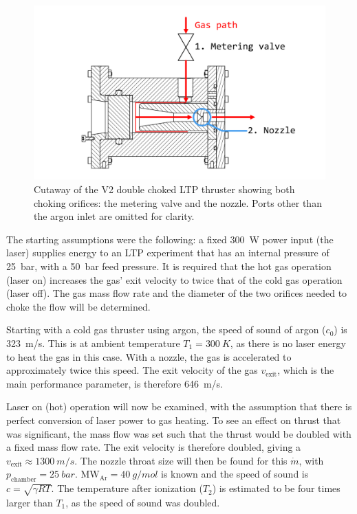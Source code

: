             \begin{figure}[h]
                \centering
                \includegraphics[width=0.8\linewidth]{assets/3 design/Double choked LTP thruster.pdf}
                \caption{Cutaway of the V2 double choked LTP thruster showing both choking orifices: the metering valve and the nozzle. Ports other than the argon inlet are omitted for clarity.}
                \label{fig:double choke sizing}
            \end{figure}
            
            The starting assumptions were the following: a fixed \qty{300}{W} power input (the laser) supplies energy to an LTP experiment that has an internal pressure of \qty{25}{bar}, with a \qty{50}{bar} feed pressure. It is required that the hot gas operation (laser on) increases the gas' exit velocity to twice that of the cold gas operation (laser off). The gas mass flow rate and the diameter of the two orifices needed to choke the flow will be determined.

            Starting with a cold gas thruster using argon, the speed of sound of argon ($c_0$) is \qty{323}{m/s}. This is at ambient temperature $T_1 = \qty{300}{K}$, as there is no laser energy to heat the gas in this case. With a nozzle, the gas is accelerated to approximately twice this speed. The exit velocity of the gas $v_\mathrm{exit}$, which is the main performance parameter, is therefore \qty{646}{m/s}.
            
            Laser on (hot) operation will now be examined, with the assumption that there is perfect conversion of laser power to gas heating. To see an effect on thrust that was significant, the mass flow was set such that the thrust would be doubled with a fixed mass flow rate. The exit velocity is therefore doubled, giving a $v_\mathrm{exit}\approx \qty{1300}{m/s}$. The nozzle throat size will then be found for this $\dot m$, with $p_\mathrm{chamber} = \qty{25}{bar}$. $\mathrm{MW_{Ar}} = \qty{40}{g/mol}$ is known and the speed of sound is $c = \sqrt{\gamma R T}$. The temperature after ionization ($T_2$) is estimated to be four times larger than $T_1$, as the speed of sound was doubled.

